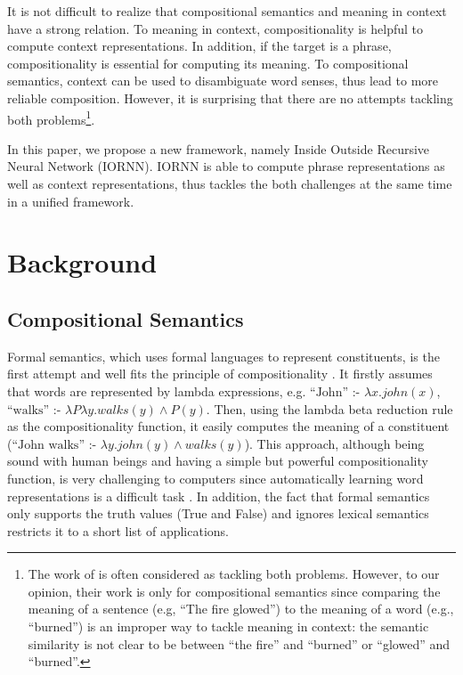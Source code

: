 \documentclass[11pt]{article}
\begin{document}
It is not difficult to realize that compositional semantics and meaning in context 
have a strong relation. To meaning in context, compositionality is helpful to compute 
context representations. In addition, if the target is a phrase, compositionality is 
essential for computing its meaning. To compositional semantics, context can be 
used to disambiguate word senses, thus lead to more reliable composition.
However, it is surprising that there are no attempts tackling both problems\footnote{
The work of  is often considered 
as tackling both problems. However, to our opinion, their work is only for 
compositional semantics since comparing the meaning of a sentence (e.g, 
``The fire glowed'') to the meaning of a word (e.g., ``burned'') is an improper way 
to tackle meaning in context: the semantic similarity is not clear to be between
``the fire'' and ``burned'' or ``glowed'' and ``burned''.}.

In this paper, we propose a new framework, namely Inside Outside Recursive 
Neural Network (IORNN). IORNN is able to compute phrase representations 
as well as context representations, thus tackles the both challenges at the same time
in a unified framework.




\section{Background}
\label{section background}

\subsection{Compositional Semantics}

Formal semantics, which uses formal languages to represent constituents, 
is the first attempt and well fits the principle of compositionality \cite{montague1970english}.
It firstly assumes that 
words are represented by lambda expressions, e.g. $\text{``John'' :- } \lambda x.john(x)$,
$\text{``walks'' :- } \lambda P \lambda y. walks(y) \wedge P(y)$. Then, using  
the lambda beta reduction rule as the compositionality function, it easily  
computes the meaning of a constituent ($\text{``John walks'' :- }
\lambda y. john(y) \wedge walks(y)$). 
This approach, although being sound with human beings and having a simple but 
powerful compositionality function, is very 
challenging to computers since automatically learning word representations 
is a difficult task \cite{DBLP:conf/coling/LeZ12}. 
In addition, the fact that formal semantics only supports the truth values (True and False) 
and ignores lexical semantics restricts it to a short list of applications.
\end{document}
